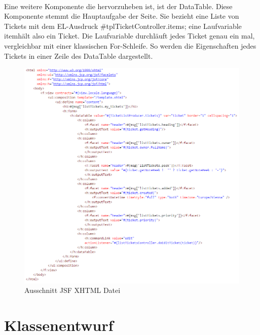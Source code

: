\paragraph{}
Eine weitere Komponente die hervorzuheben ist, ist der DataTable. Diese Komponente stemmt die Hauptaufgabe der Seite. Sie bezieht eine Liste von Tickets mit dem EL-Ausdruck \glqq \#{tplTicketController.items}\grqq; eine Laufvariable \glqq item\grqq hält also ein Ticket. Die Laufvariable durchläuft jedes Ticket genau ein mal, vergleichbar mit einer klassischen For-Schleife. So werden die Eigenschaften jedes Tickets in einer Zeile des DataTable dargestellt.

\begin{figure}[h]
	\centering
	\includegraphics[scale=0.75]{figures/serverFacesCode.png}
	\caption{Ausschnitt JSF XHTML Datei}
	\label{Abb_Jsf_XHTML_Code}
\end{figure}


\newpage
\section{Klassenentwurf}

